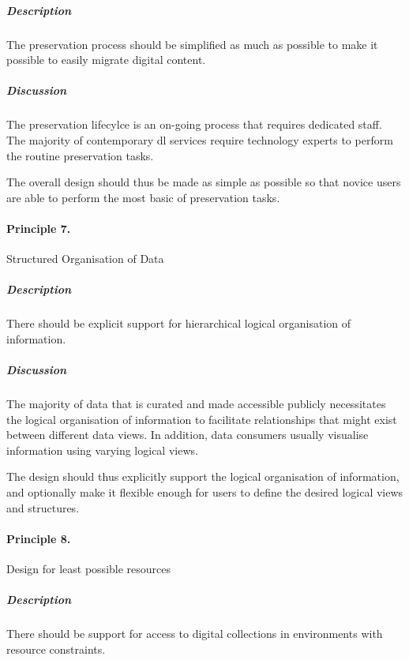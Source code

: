\subparagraph{Description} The preservation process should be simplified as much
as possible to make it possible to easily migrate digital content.


\subparagraph{Discussion} The preservation lifecylce is an on-going process
that requires dedicated staff. The majority of contemporary \gls{dl}
services require technology experts to perform the routine preservation tasks.

The overall design should thus be made as simple as possible so that novice
users are able to perform the most basic of preservation tasks.

\paragraph{Principle 7.} Structured Organisation of Data

\subparagraph{Description} There should be explicit support for hierarchical
logical organisation of information.


\subparagraph{Discussion} The majority of data that is curated and made
accessible publicly necessitates the logical organisation of information to
facilitate relationships that might exist between different data views. In
addition, data consumers usually visualise information using varying logical
views.

The design should thus explicitly support the logical organisation of
information, and optionally make it flexible enough for users to define the
desired logical views and structures.

\paragraph{Principle 8.} Design for least possible resources

\subparagraph{Description} There should be support for access to digital
collections in environments with resource constraints.


